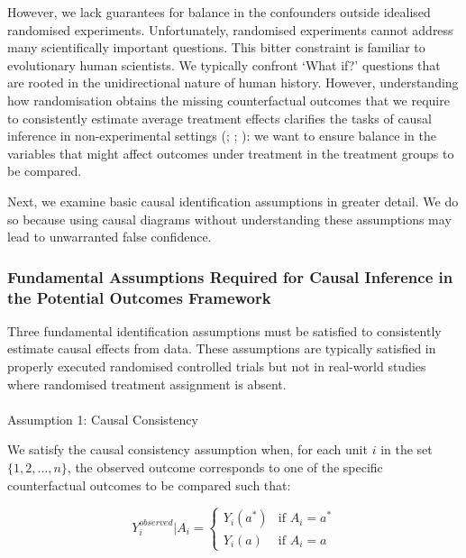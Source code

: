 \documentclass[
  single column]{article}
\makeatletter
\let\oldparagraph\paragraph
\renewcommand{\paragraph}{
    \@ifstar
      \xxxParagraphStar
      \xxxParagraphNoStar
  }
\newcommand{\xxxParagraphStar}[1]{\oldparagraph*{#1}\mbox{}}
\newcommand{\xxxParagraphNoStar}[1]{\oldparagraph{#1}\mbox{}}
\makeatother
\begin{document}
However, we lack guarantees for balance in the confounders outside
idealised randomised experiments. Unfortunately, randomised experiments
cannot address many scientifically important questions. This bitter
constraint is familiar to evolutionary human scientists. We typically
confront `What if?' questions that are rooted in the unidirectional
nature of human history. However, understanding how randomisation
obtains the missing counterfactual outcomes that we require to
consistently estimate average treatment effects clarifies the tasks of
causal inference in non-experimental settings
(;
;
): we want to
ensure balance in the variables that might affect outcomes under
treatment in the treatment groups to be compared.

Next, we examine basic causal identification assumptions in greater
detail. We do so because using causal diagrams without understanding
these assumptions may lead to unwarranted false confidence.

\subsubsection{Fundamental Assumptions Required for Causal Inference in
the Potential Outcomes
Framework}\label{fundamental-assumptions-required-for-causal-inference-in-the-potential-outcomes-framework}

Three fundamental identification assumptions must be satisfied to
consistently estimate causal effects from data. These assumptions are
typically satisfied in properly executed randomised controlled trials
but not in real-world studies where randomised treatment assignment is
absent.

\paragraph{Assumption 1: Causal
Consistency}\label{assumption-1-causal-consistency}

We satisfy the causal consistency assumption when, for each unit \(i\)
in the set \(\{1, 2, \ldots, n\}\), the observed outcome corresponds to
one of the specific counterfactual outcomes to be compared such that:

\[
Y_i^{observed}|A_i = 
\begin{cases} 
Y_i(a^*) & \text{if } A_i = a^* \\
Y_i(a) & \text{if } A_i = a
\end{cases}
\]
\end{document}
